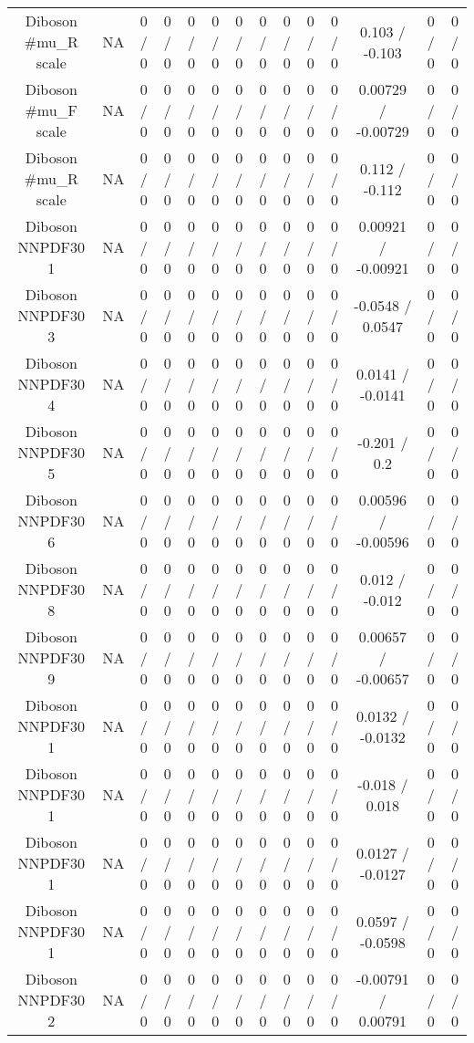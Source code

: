 \documentclass[10pt]{article}
\begin{document}
\begin{table}[htbp]
\begin{center}
\begin{tabular}{|c|c|c|c|c|c|c|c|c|c|c|c|c|c|}
  Diboson #mu_{R} scale &    NA    & 0 / 0 & 0 / 0 & 0 / 0 & 0 / 0 & 0 / 0 & 0 / 0 & 0 / 0 & 0 / 0 & 0 / 0 & 0.103 / -0.103 & 0 / 0 & 0 / 0 \\ 
  Diboson #mu_{F} scale &    NA    & 0 / 0 & 0 / 0 & 0 / 0 & 0 / 0 & 0 / 0 & 0 / 0 & 0 / 0 & 0 / 0 & 0 / 0 & 0.00729 / -0.00729 & 0 / 0 & 0 / 0 \\ 
  Diboson #mu_{R} scale &    NA    & 0 / 0 & 0 / 0 & 0 / 0 & 0 / 0 & 0 / 0 & 0 / 0 & 0 / 0 & 0 / 0 & 0 / 0 & 0.112 / -0.112 & 0 / 0 & 0 / 0 \\ 
  Diboson NNPDF30 1 &    NA    & 0 / 0 & 0 / 0 & 0 / 0 & 0 / 0 & 0 / 0 & 0 / 0 & 0 / 0 & 0 / 0 & 0 / 0 & 0.00921 / -0.00921 & 0 / 0 & 0 / 0 \\ 
  Diboson NNPDF30 3 &    NA    & 0 / 0 & 0 / 0 & 0 / 0 & 0 / 0 & 0 / 0 & 0 / 0 & 0 / 0 & 0 / 0 & 0 / 0 & -0.0548 / 0.0547 & 0 / 0 & 0 / 0 \\ 
  Diboson NNPDF30 4 &    NA    & 0 / 0 & 0 / 0 & 0 / 0 & 0 / 0 & 0 / 0 & 0 / 0 & 0 / 0 & 0 / 0 & 0 / 0 & 0.0141 / -0.0141 & 0 / 0 & 0 / 0 \\ 
  Diboson NNPDF30 5 &    NA    & 0 / 0 & 0 / 0 & 0 / 0 & 0 / 0 & 0 / 0 & 0 / 0 & 0 / 0 & 0 / 0 & 0 / 0 & -0.201 / 0.2 & 0 / 0 & 0 / 0 \\ 
  Diboson NNPDF30 6 &    NA    & 0 / 0 & 0 / 0 & 0 / 0 & 0 / 0 & 0 / 0 & 0 / 0 & 0 / 0 & 0 / 0 & 0 / 0 & 0.00596 / -0.00596 & 0 / 0 & 0 / 0 \\ 
  Diboson NNPDF30 8 &    NA    & 0 / 0 & 0 / 0 & 0 / 0 & 0 / 0 & 0 / 0 & 0 / 0 & 0 / 0 & 0 / 0 & 0 / 0 & 0.012 / -0.012 & 0 / 0 & 0 / 0 \\ 
  Diboson NNPDF30 9 &    NA    & 0 / 0 & 0 / 0 & 0 / 0 & 0 / 0 & 0 / 0 & 0 / 0 & 0 / 0 & 0 / 0 & 0 / 0 & 0.00657 / -0.00657 & 0 / 0 & 0 / 0 \\ 
  Diboson NNPDF30 1 &    NA    & 0 / 0 & 0 / 0 & 0 / 0 & 0 / 0 & 0 / 0 & 0 / 0 & 0 / 0 & 0 / 0 & 0 / 0 & 0.0132 / -0.0132 & 0 / 0 & 0 / 0 \\ 
  Diboson NNPDF30 1 &    NA    & 0 / 0 & 0 / 0 & 0 / 0 & 0 / 0 & 0 / 0 & 0 / 0 & 0 / 0 & 0 / 0 & 0 / 0 & -0.018 / 0.018 & 0 / 0 & 0 / 0 \\ 
  Diboson NNPDF30 1 &    NA    & 0 / 0 & 0 / 0 & 0 / 0 & 0 / 0 & 0 / 0 & 0 / 0 & 0 / 0 & 0 / 0 & 0 / 0 & 0.0127 / -0.0127 & 0 / 0 & 0 / 0 \\ 
  Diboson NNPDF30 1 &    NA    & 0 / 0 & 0 / 0 & 0 / 0 & 0 / 0 & 0 / 0 & 0 / 0 & 0 / 0 & 0 / 0 & 0 / 0 & 0.0597 / -0.0598 & 0 / 0 & 0 / 0 \\ 
  Diboson NNPDF30 2 &    NA    & 0 / 0 & 0 / 0 & 0 / 0 & 0 / 0 & 0 / 0 & 0 / 0 & 0 / 0 & 0 / 0 & 0 / 0 & -0.00791 / 0.00791 & 0 / 0 & 0 / 0 \\ 

\end{tabular}
\end{center}
\end{table}
\end{document}
